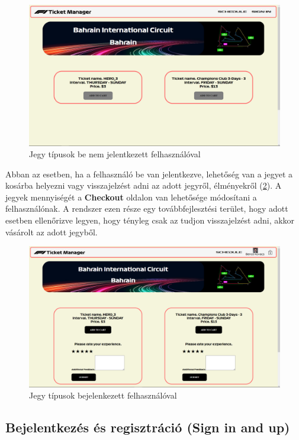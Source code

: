 \begin{figure}[!h]
	\centering
	\includegraphics[scale=0.2]{images/tickets}
	\caption{Jegy típusok be nem jelentkezett felhasználóval}
	\label{abra:ticketsUA}
\end{figure}

Abban az esetben, ha a felhasználó be van jelentkezve, lehetőség van a jegyet a kosárba helyezni vagy visszajelzést adni az adott jegyről, élményekről (\ref{abra:ticketsAuth}). A jegyek mennyiségét a \textbf{Checkout} oldalon van lehetősége módosítani a felhasználónak. A rendszer ezen része egy továbbfejlesztési terület, hogy adott esetben ellenőrizve legyen, hogy tényleg csak az tudjon visszajelzést adni, akkor vásárolt az adott jegyből. 

\begin{figure}[!h]
	\centering
	\includegraphics[scale=0.2]{images/ticketsAuth}
	\caption{Jegy típusok bejelenkezett felhasználóval}
	\label{abra:ticketsAuth}
\end{figure}

\subsection {Bejelentkezés és regisztráció (Sign in and up)}

